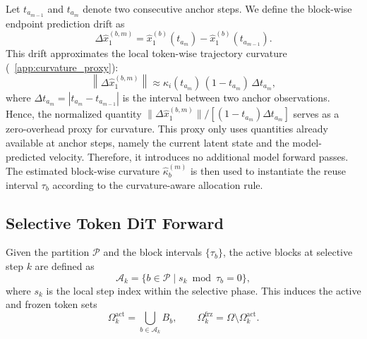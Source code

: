 Let $t_{a_{m-1}}$ and $t_{a_m}$ denote two consecutive anchor steps. We
define the block-wise endpoint prediction drift as
\begin{equation}
    \Delta \hat{x}_{1}^{(b,m)}
    =
    \hat{x}_{1}^{(b)}(t_{a_m})
    -
    \hat{x}_{1}^{(b)}(t_{a_{m-1}}).
    \label{eq:block_endpoint_drift}
\end{equation}
This drift approximates the local token-wise trajectory curvature (~\ref{app:curvature_proxy}):
\begin{equation}
    \left\| \Delta \hat{x}_{1}^{(b,m)}\right\|
    \approx
    \kappa_i(t_{a_m})\,(1-t_{a_m})\,\Delta t_{a_m},
\end{equation}
where $\Delta t_{a_m} = |t_{a_m} - t_{a_{m-1}}|$ is the interval between two anchor observations. Hence, the normalized quantity $\| \Delta \hat{x}_{1}^{(b,m)}\| / \left[(1-t_{a_m})\Delta t_{a_m}\right]$ serves as a zero-overhead proxy for curvature. This proxy only uses quantities already available at anchor steps, namely
the current latent state and the model-predicted velocity. Therefore, it
introduces no additional model forward passes. The estimated block-wise
curvature $\hat{\kappa}_b^{(m)}$ is then used to instantiate the reuse
interval $\tau_b$ according to the curvature-aware allocation rule.

\subsection{Selective Token DiT Forward}
\label{sec:runtime}

Given the partition $\mathcal{P}$ and the block intervals $\{\tau_b\}$, the active blocks at selective step $k$ are defined as
\begin{equation}
    \mathcal{A}_k = \{ b \in \mathcal{P} \mid s_k \bmod \tau_b = 0 \},
\end{equation}
where $s_k$ is the local step index within the selective phase. This induces the active and frozen token sets
\begin{equation}
    \Omega_k^{\mathrm{act}} = \bigcup_{b \in \mathcal{A}_k} B_b,
    \qquad
    \Omega_k^{\mathrm{frz}} = \Omega \setminus \Omega_k^{\mathrm{act}}.
\end{equation}

